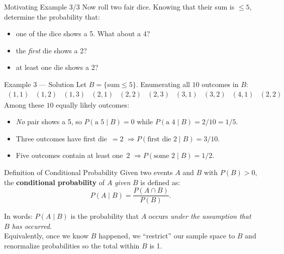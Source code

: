 \documentclass[aspectratio=169,11pt]{beamer} %
\begin{document}
\begin{frame}{Motivating Example 3/3}
Now roll two fair dice. Knowing that their sum is $\le 5$, determine the probability that:
\begin{itemize}
    \item one of the dice shows a 5. What about a 4?
    \item the \emph{first} die shows a 2?
    \item at least one die shows a 2?
\end{itemize}
\end{frame}
\begin{frame}{Example 3 — Solution}
Let $B=\{\text{sum}\le5\}$.  Enumerating all $10$ outcomes in $B$:
\[
\begin{array}{c|cccccccccc}
(1,1)&(1,2)&(1,3)&(2,1)&(2,2)&(2,3)&(3,1)&(3,2)&(4,1)&(2,2)
\end{array}
\]
Among these $10$ equally likely outcomes:
\begin{itemize}
  \item \emph{No} pair shows a 5, so $P(\text{a 5}\mid B)=0$ while $P(\text{a 4}\mid B)=2/10=1/5$.
  \item Three outcomes have first die $=2$ $\Rightarrow P(\text{first die 2}\mid B)=3/10$.
  \item Five outcomes contain at least one 2 $\Rightarrow P(\text{some 2}\mid B)=1/2$.
\end{itemize}
\end{frame}




\begin{frame}{Definition of Conditional Probability}
\large
Given two events $A$ and $B$ with $P(B) > 0$, the \textbf{conditional probability} of $A$ \emph{given} $B$ is defined as:
\[ P(A \mid B) = \frac{P(A \cap B)}{P(B)}.\]

In words: $P(A \mid B)$ is the probability that $A$ occurs \emph{under the assumption that $B$ has occurred}. \\[1ex]

Equivalently, once we know $B$ happened, we ``restrict'' our sample space to $B$ and renormalize probabilities so the total within $B$ is 1.
\end{frame}
\end{document}
